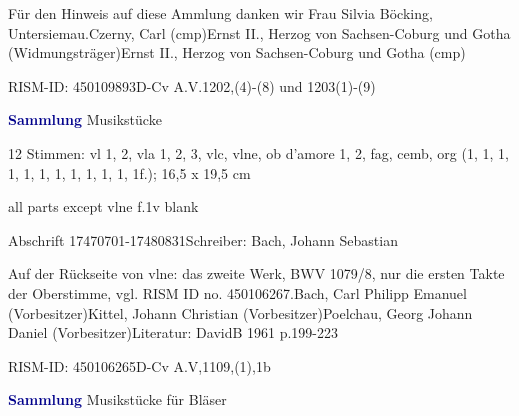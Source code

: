 \documentclass[a4paper, twocolumn, 11pt]{book}
\begin{document}
\par Für den Hinweis auf diese Ammlung danken wir Frau Silvia Böcking, Untersiemau.\newline Czerny, Carl  (cmp)\newline Ernst II., Herzog von Sachsen-Coburg und Gotha  (Widmungsträger)\newline Ernst II., Herzog von Sachsen-Coburg und Gotha  (cmp)
\par RISM-ID: 450109893\newline D-Cv  A.V.1202,(4)-(8) und 1203(1)-(9)
\par \vspace{16pt} \textcolor{darkblue}{\textbf{Sammlung}} Musikstücke
\par \begin{itshape}\end{itshape} 
\par \textcolor{darkblue}{}  12 Stimmen: vl 1, 2, vla 1, 2, 3, vlc, vlne, ob d'amore 1, 2, fag, cemb, org  (1, 1, 1, 1, 1, 1, 1, 1, 1, 1, 1, 1f.); 16,5 x 19,5 cm\newline \begin{small} all parts except vlne f.1v blank\end{small} \newline Abschrift  17470701-17480831\newline Schreiber: Bach, Johann Sebastian
\par Auf der Rückseite von vlne: das zweite Werk, BWV 1079/8, nur die ersten Takte der Oberstimme, vgl. RISM ID no. 450106267.\newline Bach, Carl Philipp Emanuel  (Vorbesitzer)\newline Kittel, Johann Christian  (Vorbesitzer)\newline Poelchau, Georg Johann Daniel  (Vorbesitzer)\newline Literatur: DavidB 1961  p.199-223
\par RISM-ID: 450106265\newline D-Cv  A.V,1109,(1),1b
\par \vspace{16pt} \textcolor{darkblue}{\textbf{Sammlung}} Musikstücke für Bläser
\end{document}
